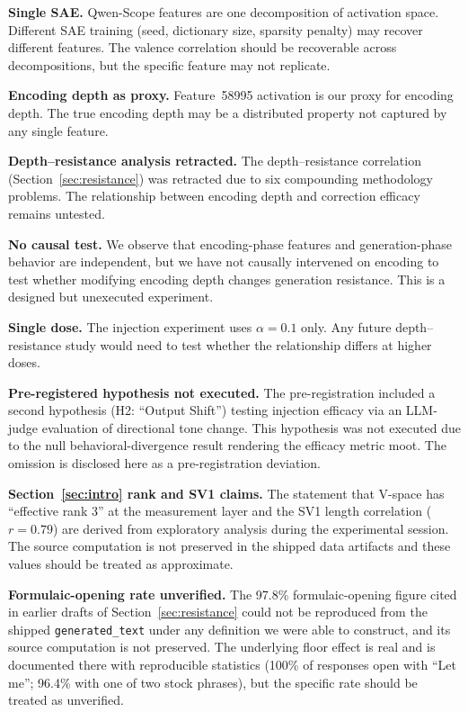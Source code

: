 \documentclass[11pt,a4paper]{article}
\begin{document}
\textbf{Single SAE.} Qwen-Scope features are one decomposition of
activation space. Different SAE training (seed, dictionary size,
sparsity penalty) may recover different features. The valence correlation
should be recoverable across decompositions, but the specific feature
may not replicate.

\textbf{Encoding depth as proxy.} Feature~58995 activation is our proxy for
encoding depth. The true encoding depth may be a distributed property not
captured by any single feature.

\textbf{Depth--resistance analysis retracted.} The depth--resistance
correlation (Section~\ref{sec:resistance}) was retracted due to six
compounding methodology problems. The relationship between encoding
depth and correction efficacy remains untested.

\textbf{No causal test.} We observe that encoding-phase features and
generation-phase behavior are independent, but we have not causally
intervened on encoding to test whether modifying encoding depth changes
generation resistance. This is a designed but unexecuted experiment.

\textbf{Single dose.} The injection experiment uses $\alpha{=}0.1$ only.
Any future depth--resistance study would need to test whether the
relationship differs at higher doses.

\textbf{Pre-registered hypothesis not executed.} The pre-registration
included a second hypothesis (H2: ``Output Shift'') testing injection
efficacy via an LLM-judge evaluation of directional tone change. This
hypothesis was not executed due to the null behavioral-divergence result
rendering the efficacy metric moot. The omission is disclosed here as a
pre-registration deviation.

\textbf{Section~\ref{sec:intro} rank and SV1 claims.} The statement
that V-space has ``effective rank 3'' at the measurement layer and the
SV1 length correlation ($r{=}0.79$) are derived from exploratory
analysis during the experimental session. The source computation is not
preserved in the shipped data artifacts and these values should be
treated as approximate.

\textbf{Formulaic-opening rate unverified.} The 97.8\% formulaic-opening
figure cited in earlier drafts of Section~\ref{sec:resistance} could not be
reproduced from the shipped \texttt{generated\_text} under any definition we
were able to construct, and its source computation is not preserved. The
underlying floor effect is real and is documented there with
reproducible statistics (100\% of responses open with ``Let me''; 96.4\%
with one of two stock phrases), but the specific rate should be treated as
unverified.
\end{document}
